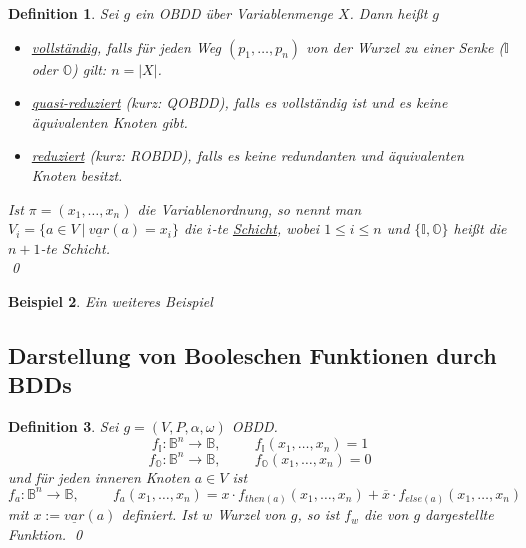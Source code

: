 \documentclass[ngerman]{scrartcl}
\theoremstyle{custom}
\newtheorem{mdef}{Definition} \numberwithin{mdef}{subsection}
\newtheorem{mex}[mdef]{Beispiel}
\newcommand{\0}{\mathbf{0}}
\newcommand{\1}{\mathbf{L}}
\begin{document}
\begin{mdef}
Sei $g$ ein OBDD \"uber Variablenmenge $X$. Dann hei\ss t $g$
\begin{itemize}
\item[(1)] \underline{vollst\"andig}, falls f\"ur jeden Weg
  $(p_1,\dots,p_n)$ von der Wurzel zu einer Senke ($\mathds{I}$ oder
  $\mathds{O}$) gilt: $n = \vert X \vert$.
\item[(2)] \underline{quasi-reduziert} (kurz: QOBDD), falls es
  vollst\"andig ist und es keine \"aquivalenten Knoten gibt.
\item[(3)] \underline{reduziert} (kurz: ROBDD), falls es keine
  redundanten und \"aquivalenten Knoten besitzt.
\end{itemize}
Ist $\pi = (x_1, \dots, x_n)$ die Variablenordnung, so nennt man
$V_i=\{a \in V ~\vert~ \underline{var}(a)=x_i\}$ die $i$-te
\underline{Schicht}, wobei $1 \leq i \leq n$ und $\{\mathds{I},
\mathds{O}\}$ hei\ss t die $n+1$-te Schicht.\\
\qed
\end{mdef}

\begin{mex}
Ein weiteres Beispiel
\end{mex}

\subsection{Darstellung von Booleschen Funktionen durch BDDs}
\begin{mdef}
Sei $g=(V,P,\alpha,\omega)$ OBDD.
\begin{equation*}
f_{\mathds{I}}: \mathds{B}^n \rightarrow \mathds{B}, \hspace{1cm}
f_{\mathds{I}}(x_1,\dots, x_n)=1
\end{equation*}
\begin{equation*}
f_{\mathds{O}}: \mathds{B}^n \rightarrow \mathds{B}, \hspace{1cm}
f_{\mathds{O}}(x_1,\dots, x_n)=0
\end{equation*}
und f\"ur jeden inneren Knoten $a \in V$ ist
\begin{equation*}
f_a : \mathds{B}^n \rightarrow \mathds{B}, \hspace{1cm}
f_a(x_1,\dots,x_n) = x \cdot f_{then(a)}(x_1,\dots,x_n) + \overline{x}
\cdot f_{else(a)}(x_1,\dots,x_n)
\end{equation*}
mit $x:=\underline{var}(a)$ definiert. Ist $w$ Wurzel von $g$, so ist
$f_w$ die von $g$ dargestellte Funktion.
\qed
\end{mdef}
\end{document}
